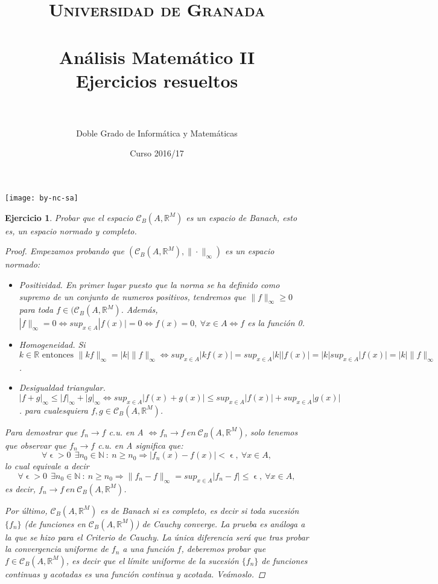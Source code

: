 \documentclass[11pt, a4paper]{article}
\title{
  \normalfont \normalsize 
  \textsc{Universidad de Granada} \\ [25pt]    %
  \horrule{0.5pt} \\[0.4cm] %
  \huge Análisis Matemático II\\ \Large{Ejercicios resueltos}\\ %
  \horrule{2pt} \\[0.5cm] %
}
\author{\Large{Doble Grado de Informática y Matemáticas}}
\date{\vspace{-1.5em} \normalsize Curso 2016/17}
\let\epsilon\upvarepsilon
\theoremstyle{theorem-style}
\theoremstyle{definition-style}
\newtheorem{ejer}{Ejercicio}
\theoremstyle{remark-style}
\theoremstyle{example-style}
\begin{document}
\maketitle  %
\vfill
\begin{center}
\texttt{[image: by-nc-sa]}  %
\end{center}
\newpage


\begin{ejer}
    Probar que el espacio $\mathcal{C}_B(A,\mathbb{R}^M)$ es un espacio de Banach, esto es, un espacio normado y completo.

\begin{proof}
	Empezamos probando que $(\mathcal{C}_B(A, \mathbb R^M), \|\cdot \|_\infty)$ es un espacio normado:
	\begin{itemize}
	
\item  Positividad. En primer lugar puesto que la norma se ha definido como supremo de un conjunto de numeros positivos, tendremos que $\|f\|_\infty \geq 0$ para toda $f\in (\mathcal{C}_B(A, \mathbb R^M)$. Además, $|f\|_\infty=0 \iff sup_{x \in A}|f(x)|=0 \iff f(x)=0, \ \forall x \in A \iff f$ es la función 0.
\item Homogeneidad. Si $k \in \mathbb R \text{ entonces } \|kf\|_\infty=|k|\|f\|_\infty \iff sup_{x \in A}|kf(x)|=sup_{x \in A}|k||f(x)|=|k|sup_{x \in A}|f(x)| = |k| \| f\|_\infty$.
\item Desigualdad triangular.
$|f+g|_\infty \leq |f|_\infty + |g|_\infty\iff sup_{x \in A}|f(x)+g(x)| \leq sup_{x \in A}|f(x)| + sup_{x \in A}|g(x)|$.
para cualesquiera $f, g \in \mathcal{C}_B(A, \mathbb R^M)$.
\end{itemize}

Para demostrar que ${f_n} \to f$  c.u. en A $\iff f_n \to f\ en\ \mathcal{C}_B(A, \mathbb R^M)$, solo tenemos que observar que ${f_n} \to f$  c.u. en A  significa que: $$\forall \epsilon>0 \ \ \exists n_0\in \mathbb N \ :\ n\geq n_0 \Rightarrow |f_n(x)-f(x) |<\epsilon , \ \forall x\in A,$$
lo cual equivale a decir
$$\forall \epsilon>0 \ \ \exists n_0\in \mathbb N \ :\ n\geq n_0 \Rightarrow \|f_n-f\|_\infty = sup_{x \in A} |f_n-f| \leq \epsilon , \ \forall x\in A,$$
es decir, $f_n \to f\ en\ \mathcal{C}_B(A, \mathbb R^M)$.
 
Por último, $\mathcal{C}_B(A, \mathbb R^M)$ es de Banach si es completo, es decir si toda sucesión $\{ f_n\}$ (de funciones en $\mathcal{C}_B(A, \mathbb R^M)$) de Cauchy converge. La prueba es análoga a la que se hizo para el \textit{Criterio de Cauchy}. La única diferencia será que tras probar la convergencia uniforme de $f_n$ a una función  $f$, deberemos probar que $f\in \mathcal{C}_B(A,\mathbb{R}^M)$, es decir que el límite uniforme de la sucesión $\{f_n\}$ de funciones continuas y acotadas es una función continua y acotada. Veámoslo.


\end{proof}
\end{ejer}
\end{document}

